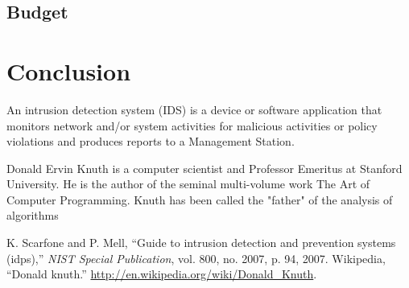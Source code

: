 \documentclass{fisatproject}
\begin{document}
 \section{Budget}


\chapter{Conclusion}

An intrusion detection system (IDS) \cite{nist} is a device or software application that monitors network and/or system activities for malicious activities or policy violations and produces reports to a Management Station.


Donald Ervin Knuth \cite{knuth} is a computer scientist and Professor Emeritus at Stanford University. He is the author of the seminal multi-volume work The Art of Computer Programming. Knuth has been called the "father" of the analysis of algorithms


\begin{thebibliography}{1}
 K. Scarfone and P. Mell, ``Guide to intrusion detection and prevention systems
(idps),'' \textit{NIST Special Publication}, vol. 800, no. 2007, p. 94, 2007.
 Wikipedia, ``Donald knuth.'' \url{http://en.wikipedia.org/wiki/Donald_Knuth}.


\end{thebibliography}
\end{document}

